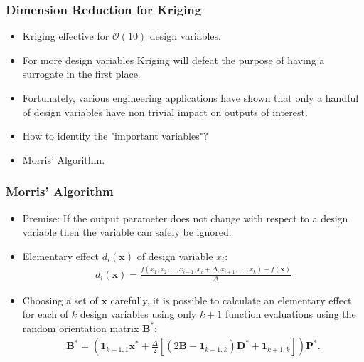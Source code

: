 \documentclass{beamer}
\begin{document}
\begin{frame}
\frametitle{Dimension Reduction for Kriging}

\begin{itemize}
  \item Kriging effective for $\mathcal{O}(10)$ design variables.
  \item For more design variables Kriging will defeat the purpose of having a surrogate in the first place.
  \item Fortunately, various engineering applications have shown that only a handful of design variables have non trivial impact on outputs of interest.
  \item How to identify the "important variables"?
  \item Morris' Algorithm.   
\end{itemize}

\end{frame}
\begin{frame}
\frametitle{Morris' Algorithm}

\begin{itemize}
  \item Premise: If the output parameter does not change with respect to a design variable then the variable can safely be ignored.
  \item Elementary effect $d_i\left(\textbf{x}\right)$ of design variable $x_i$:
\begin{align*}
 d_i\left(\textbf{x}\right) = \frac{f\left(x_1,x_2,...,x_{i-1},x_i+\Delta,x_{i+1},....,x_k 									\right) - f\left(\textbf{x}\right)}{\Delta}      
\end{align*} 
  \item Choosing a set of $\textbf{x}$ carefully, it is possible to calculate an elementary effect for each of $k$ design variables using only $k+1$ function evaluations using the random orientation matrix $\textbf{B}^*$: 
\begin{align*}
 \textbf{B}^* = \left(\textbf{1}_{k+1,1}\textbf{x}^* + \frac{\Delta}{2}\left[
                 \left(2\textbf{B} - \textbf{1}_{k+1,k}\right)\textbf{D}^* + 
                  \textbf{1}_{k+1,k}\right]\right)\textbf{P}^*.
\end{align*}                
\end{itemize}

\end{frame}
\end{document}
